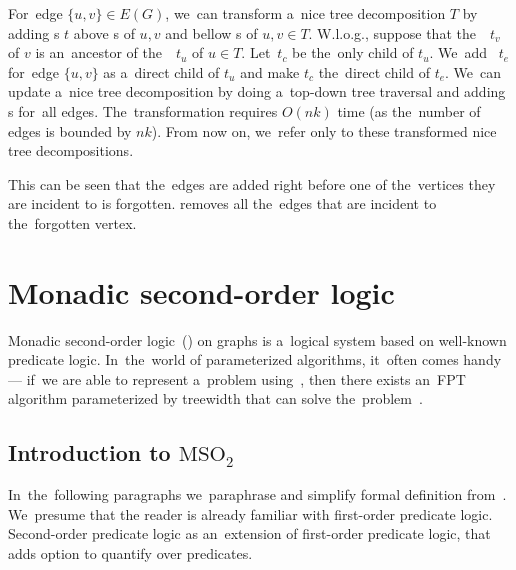 For~edge \( \{u, v\} \in E(G) \), we~can transform a~nice tree decomposition \( T \)
by adding \IntroduceEdgeNode{}s \( t \) above \IntroduceVertexNode{}s of \( u, v \)
and bellow \ForgetVertexNode{}s of \( u, v \in T \).
%
W.l.o.g., suppose that the~\ForgetVertexNode{}~\( t_v \) of \( v \) is
an~ancestor of the~\ForgetVertexNode{}~\( t_u \) of \( u \in T \).
Let~\( t_c \) be the~only child of \( t_u \).
%
We~add \IntroduceEdgeNode{}~\( t_e \) for~edge \( \{u, v\} \)
as a~direct child of \( t_u \) and make \( t_c \) the~direct child of \( t_e \).
%
We~can update a~nice tree decomposition by doing
a~top-down tree traversal and adding \IntroduceEdgeNode{}s for~all edges.
The~transformation requires \( O(nk) \) time (as the~number of edges is bounded by \( nk \)).
From now on, we~refer only to these transformed nice tree decompositions.

%
%
This can be seen that the~edges are added right before one of the~vertices
they are incident to is forgotten. \ForgetVertexNode{} removes all the~edges
that are incident to the~forgotten vertex.

\section{Monadic second-order logic}

Monadic second-order logic~(\MSO{}) on graphs is a~logical system based on
well-known predicate logic.
In~the~world of parameterized algorithms,
it~often comes handy --- if~we are able to represent a~problem using~\MSO{},
then there exists an~FPT algorithm parameterized by treewidth
that can solve the~problem~\cite{tree_width_mso}.

\subsection{Introduction to \( \text{MSO}_2 \)}

In~the~following paragraphs we~paraphrase and simplify formal definition
from~\cite{book_parametrized_algorithms}.
We~presume that the reader is already familiar with first-order predicate logic.
Second-order predicate logic as an~extension of first-order predicate logic,
that adds option to quantify over predicates.

